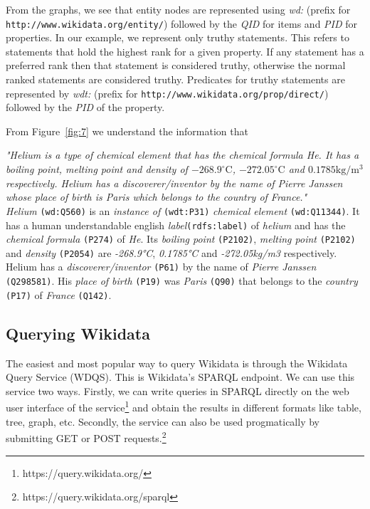 From the graphs, we see that entity nodes are represented using \textit{wd:} (prefix for \texttt{http://www.wikidata.org/entity/}) followed by the \textit{QID} for items and \textit{PID} for properties. In our example, we represent only truthy statements. This refers to statements that hold the highest rank for a given property. If any statement has a preferred rank then that statement is considered truthy, otherwise the normal ranked statements are considered truthy. Predicates for truthy statements are represented by \textit{wdt:} (prefix for \texttt{http://www.wikidata.org/prop/direct/}) followed by the \textit{PID} of the property. 

From Figure~\ref{fig:7} we understand the information that

\hspace*{0.25cm} \textit{"Helium is a type of chemical element that has the chemical formula He. It has a boiling point, melting point and density of $-268.9^\circ\text{C}$, $-272.05^\circ\text{C}$ and $0.1785\text{kg}/\text{m}^{3}$ respectively. Helium has a discoverer/inventor by the name of Pierre Janssen whose place of birth is Paris which belongs to the country of France."}\\

 \textit{Helium} \texttt{(wd:Q560)} is an \textit{instance of} \texttt{(wdt:P31)} \textit{chemical element} \texttt{(wd:Q11344)}. It has a human understandable english \textit{label}\texttt{(rdfs:label)} of \textit{helium} and has the \textit{chemical formula} \texttt{(P274)} of \textit{He}. Its \textit{boiling point} \texttt{(P2102)}, \textit{melting point} \texttt{(P2102)} and \textit{density} \texttt{(P2054)} are \textit{-268.9°C}, \textit{0.1785°C} and \textit{-272.05kg/m3} respectively. Helium has a \textit{discoverer/inventor} \texttt{(P61)} by the name of \textit{Pierre Janssen} \texttt{(Q298581)}. His \textit{place of birth} \texttt{(P19)} was \textit{Paris} \texttt{(Q90)} that belongs to the \textit{country} \texttt{(P17)} of \textit{France} \texttt{(Q142)}.

\subsection{Querying Wikidata}

The easiest and most popular way to query Wikidata is through the Wikidata Query Service (WDQS). This is Wikidata's SPARQL endpoint. We can use this service two ways. Firstly, we can write queries in SPARQL directly on the web user interface of the service\footnote{https://query.wikidata.org/} and obtain the results in different formats like table, tree, graph, etc. Secondly, the service can also be used progmatically by submitting GET or POST requests.\footnote{https://query.wikidata.org/sparql}

